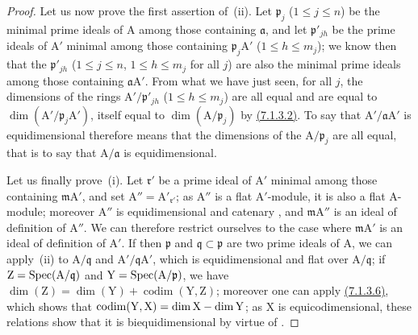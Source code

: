 \begin{proof}
Let us now prove the first assertion of~(ii).
Let $\mathfrak{p}_j$ ($1\leqslant j\leqslant n$) be the minimal prime ideals of $\mathrm{A}$ among those containing $\mathfrak{a}$, and let $\mathfrak{p}'_{jh}$ be the prime ideals of $\mathrm{A}'$ minimal among those containing $\mathfrak{p}_j\mathrm{A}'$ ($1\leqslant h\leqslant m_j$); we know then  that the $\mathfrak{p}'_{jh}$ ($1\leqslant j\leqslant n$, $1\leqslant h\leqslant m_j$ for all $j$) are also the minimal prime ideals among those containing $\mathfrak{a}\mathrm{A}'$.
From what we have just seen, for all $j$, the dimensions of the rings $\mathrm{A}'/\mathfrak{p}'_{jh}$ ($1\leqslant h\leqslant m_j$) are all equal and are equal to $\dim(\mathrm{A}'/\mathfrak{p}_j\mathrm{A}')$, itself equal to $\dim(\mathrm{A}/\mathfrak{p}_j)$ by {\hyperref[IV.7.1.3.2]{(7.1.3.2)}}.
To say that $\mathrm{A}'/\mathfrak{a}\mathrm{A}'$ is equidimensional therefore means that the dimensions of the $\mathrm{A}/\mathfrak{p}_j$ are all equal, that is to say that $\mathrm{A}/\mathfrak{a}$ is equidimensional.

Let us finally prove~(i).
Let $\mathfrak{r}'$ be a prime ideal of $\mathrm{A}'$ minimal among those containing $\mathfrak{m}\mathrm{A}'$, and set $\mathrm{A}''=\mathrm{A}'_{\mathfrak{r}'}$; as $\mathrm{A}''$ is a flat $\mathrm{A}'$-module, it is also a flat $\mathrm{A}$-module; moreover $\mathrm{A}''$ is equidimensional and catenary , and $\mathfrak{m}\mathrm{A}''$ is an ideal of definition of $\mathrm{A}''$.
We can therefore restrict ourselves to the case where $\mathfrak{m}\mathrm{A}'$ is an ideal of definition of $\mathrm{A}'$.
If then $\mathfrak{p}$ and $\mathfrak{q}\subset\mathfrak{p}$ are two prime ideals of $\mathrm{A}$, we can apply~(ii) to $\mathrm{A}/\mathfrak{q}$ and $\mathrm{A}'/\mathfrak{q}\mathrm{A}'$, which is equidimensional and flat over $\mathrm{A}/\mathfrak{q}$; if $\mathrm{Z}=\operatorname{Spec}(\mathrm{A}/\mathfrak{q})$ and $\mathrm{Y}=\operatorname{Spec}(\mathrm{A}/\mathfrak{p})$, we have
$\dim(\mathrm{Z})=\dim(\mathrm{Y})+\operatorname{codim}(\mathrm{Y},\mathrm{Z})$;
moreover one can apply {\hyperref[IV.7.1.3.6]{(7.1.3.6)}}, which shows that $\operatorname{codim}(\mathrm{Y},\mathrm{X})=\dim\mathrm{X}-\dim\mathrm{Y}$; as $\mathrm{X}$ is equicodimensional, these relations show that it is biequidimensional by virtue of .
\end{proof}

